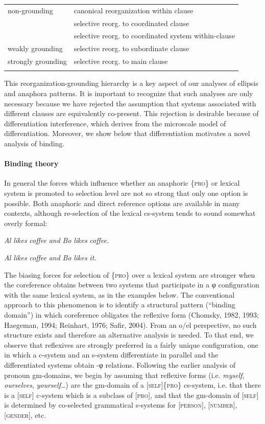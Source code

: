 \begin{tabularx}{\textwidth}{XX}
\lsptoprule
non-grounding & canonical reorganization within clause\\
& selective reorg. to coordinated clause\\
& selective reorg. to coordinated system within-clause\\
weakly grounding & selective reorg. to subordinate clause\\
strongly grounding & selective reorg. to main clause\\
\lspbottomrule
\end{tabularx}
  This reorganization-grounding hierarchy is a key aspect of our analyses of ellipsis and anaphora patterns. It is important to recognize that such analyses are only necessary because we have rejected the assumption that systems associated with different clauses are equivalently co-present. This rejection is desirable because of differentiation interference, which derives from the microscale model of differentiation. Moreover, we show below that differentiation motivates a novel analysis of binding.

\paragraph{Binding theory}

In general the forces which influence whether an anaphoric \{\textsc{pro}\} or lexical system is promoted to selection level are not so strong that only one option is possible. Both anaphoric and direct reference options are available in many contexts, although re-selection of the lexical cs-system tends to sound somewhat overly formal:

    \textit{Al} \textit{likes} \textit{coffee} \textit{and} \textit{Bo} \textit{likes} \textit{coffee.}

    \textit{Al} \textit{likes} \textit{coffee} \textit{and} \textit{Bo} \textit{likes} \textit{it.}

  The biasing forces for selection of \{\textsc{pro}\} over a lexical system are stronger when the coreference obtains between two systems that participate in a φ configuration with the same lexical system, as in the examples below. The conventional approach to this phenomenon is to identify a structural pattern (“binding domain”) in which coreference obligates the reflexive form (Chomsky, 1982, 1993; Haegeman, 1994; Reinhart, 1976; Safir, 2004). From an o/el perspective, no such structure exists and therefore an alternative analysis is needed. To that end, we observe that reflexives are strongly preferred in a fairly unique configuration, one in which a c-system and an s-system differentiate in parallel and the differentiated systems obtain -φ relations. Following the earlier analysis of pronoun gm-domains, we begin by assuming that reflexive forms (i.e. \textit{myself}, \textit{ourselves}, \textit{yourself}…) are the gm-domain of a [\textsc{self}]\{\textsc{pro}\} cs-system, i.e. that there is a [\textsc{self}] c-system which is a subclass of [\textsc{pro}], and that the gm-domain of [\textsc{self}] is determined by co-selected grammatical s-systems for [\textsc{person}], [\textsc{number}], [\textsc{gender}], etc. 

